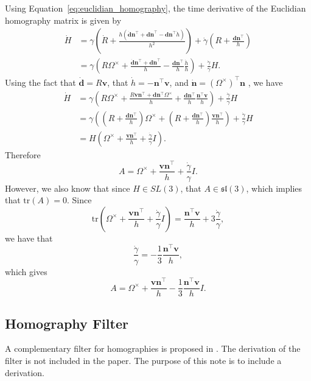 Using Equation~\eqref{eq:euclidian_homography}, the time derivative of the Euclidian homography matrix is given by
\begin{align*}
\dot{H} &= \gamma \left(\dot{R} + \frac{h(\dot{\mathbf{d}}\mathbf{n}^\top+\mathbf{d}\dot{\mathbf{n}}^\top-\mathbf{d}\mathbf{n}^\top \dot{h})}{h^2} \right) + \dot{\gamma}(R+\frac{\mathbf{d}\mathbf{n}^\top}{h}) \\
&= \gamma \left(R\Omega^\times + \frac{\dot{\mathbf{d}}\mathbf{n}^\top+\mathbf{d}\dot{\mathbf{n}}^\top}{h}-\frac{\mathbf{d}\mathbf{n}^\top}{h}\frac{\dot{h}}{h} \right) + \frac{\dot{\gamma}}{\gamma}H.
\end{align*}
Using the fact that $\dot{\mathbf{d}} = R\mathbf{v}$, that $\dot{h} = -\mathbf{n}^\top\mathbf{v}$, and $\dot{\mathbf{n}} = (\Omega^\times)^\top\mathbf{n}$ , we have 
\begin{align*}
\dot{H} &= \gamma \left(R\Omega^\times + \frac{R\mathbf{v}\mathbf{n}^\top+\mathbf{d}\mathbf{n}^\top\Omega^\times}{h}+\frac{\mathbf{d}\mathbf{n}^\top}{h}\frac{\mathbf{n}^\top\mathbf{v}}{h} \right) + \frac{\dot{\gamma}}{\gamma}H \\
&= \gamma \left( \left(R+\frac{\mathbf{d}\mathbf{n}^\top}{h}\right)\Omega^\times + \left(R+\frac{\mathbf{d}\mathbf{n}^\top}{h}\right)\frac{\mathbf{v}\mathbf{n}^\top}{h} \right) + \frac{\dot{\gamma}}{\gamma}H \\
&= H \left( \Omega^\times + \frac{\mathbf{v}\mathbf{n}^\top}{h} + \frac{\dot{\gamma}}{\gamma}I \right).
\end{align*}
Therefore 
\[
A = \Omega^\times + \frac{\mathbf{v}\mathbf{n}^\top}{h} + \frac{\dot{\gamma}}{\gamma}I.
\]
However, we also know that since $H\in SL(3)$, that $A\in\mathfrak{sl}(3)$, which implies that $\text{tr}(A)=0$.  Since
\[
\text{tr}\left(\Omega^\times + \frac{\mathbf{v}\mathbf{n}^\top}{h} + \frac{\dot{\gamma}}{\gamma}I \right) = \frac{\mathbf{n}^\top\mathbf{v}}{h} + 3\frac{\dot{\gamma}}{\gamma},
\]
we have that
\[
\frac{\dot{\gamma}}{\gamma} = -\frac{1}{3}\frac{\mathbf{n}^\top\mathbf{v}}{h},
\]
which gives
\[
A = \Omega^\times + \frac{\mathbf{v}\mathbf{n}^\top}{h} -\frac{1}{3}\frac{\mathbf{n}^\top\mathbf{v}}{h} I.
\]



\subsection{Homography Filter}
A complementary filter for homographies is proposed in \cite{MahonyHamelMorinMalis12}.  The derivation of the filter is not included in the paper.  The purpose of this note is to include a derivation.  

